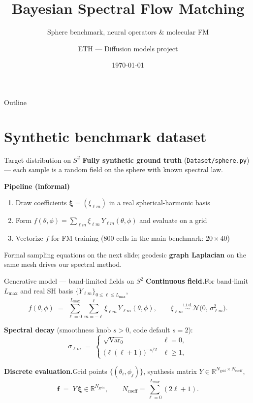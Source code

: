 \documentclass[aspectratio=169,11pt]{beamer}
\title{Bayesian Spectral Flow Matching}
\subtitle{Sphere benchmark, neural operators \& molecular FM}
\author{ETH --- Diffusion models project}
\institute{bayesian-spectral-flow-matching}
\date{\today}
\begin{document}
\begin{frame}
  \titlepage
\end{frame}

\begin{frame}{Outline}
  \tableofcontents
\end{frame}

\section{Synthetic benchmark dataset}

\begin{frame}{Target distribution on \texorpdfstring{$S^2$}{S2}}
  \textbf{Fully synthetic ground truth} (\texttt{Dataset/sphere.py}) --- each sample is a random field on the sphere with known spectral law.

  \vspace{0.5em}
  \textbf{Pipeline (informal)}
  \begin{enumerate}\setlength{\itemsep}{0.2em}
    \item Draw coefficients $\boldsymbol{\xi} = (\xi_{\ell m})$ in a real spherical-harmonic basis
    \item Form $f(\theta,\phi) = \sum_{\ell m} \xi_{\ell m}\, Y_{\ell m}(\theta,\phi)$ and evaluate on a grid
    \item Vectorize $f$ for FM training ($800$ cells in the main benchmark: $20{\times}40$)
  \end{enumerate}

  \vspace{0.35em}
  Formal sampling equations on the next slide; geodesic \textbf{graph Laplacian} on the same mesh drives our spectral method.
\end{frame}

\begin{frame}{Generative model --- band-limited fields on \texorpdfstring{$S^2$}{S2}}
  \small
  \textbf{Continuous field.}\quad For band-limit $L_{\max}$ and real SH basis $\{Y_{\ell m}\}_{0\le \ell\le L_{\max}}$,
  \[
    f(\theta,\phi) \;=\; \sum_{\ell=0}^{L_{\max}} \sum_{m=-\ell}^{\ell} \xi_{\ell m}\, Y_{\ell m}(\theta,\phi),
    \qquad
    \xi_{\ell m} \stackrel{\text{i.i.d.}}{\sim} \mathcal{N}\bigl(0,\,\sigma_{\ell m}^2\bigr).
  \]

  \textbf{Spectral decay} (smoothness knob $s>0$, code default $s{=}2$):
  \[
    \sigma_{\ell m} \;=\;
    \begin{cases}
      \sqrt{\mathrm{Var}_0} & \ell = 0,\\[0.35em]
      \bigl(\ell(\ell+1)\bigr)^{-s/2} & \ell \ge 1,
    \end{cases}
  \]

  \textbf{Discrete evaluation.}\quad Grid points $\{(\theta_i,\phi_j)\}$, synthesis matrix $Y \in \mathbb{R}^{N_{\mathrm{grid}} \times N_{\mathrm{coeff}}}$,
  \[
    \mathbf{f} \;=\; Y\,\boldsymbol{\xi} \in \mathbb{R}^{N_{\mathrm{grid}}},
    \qquad N_{\mathrm{coeff}} = \sum_{\ell=0}^{L_{\max}} (2\ell+1).
  \]
  \normalsize
\end{frame}
\end{document}
